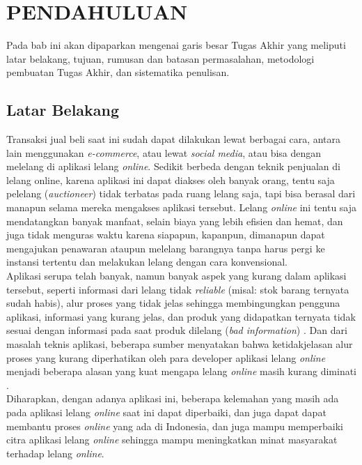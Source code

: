 \chapter{PENDAHULUAN}
  Pada bab ini akan dipaparkan mengenai garis besar Tugas Akhir yang meliputi latar belakang, tujuan, rumusan dan batasan permasalahan, metodologi pembuatan Tugas Akhir, dan sistematika penulisan.
  
  \section{Latar Belakang}	
	\indent Transaksi jual beli saat ini sudah dapat dilakukan lewat berbagai cara, antara lain menggunakan \textit{e-commerce}, atau lewat \textit{social media}, atau bisa dengan melelang di aplikasi lelang \textit{online}. Sedikit berbeda dengan teknik penjualan di lelang online, karena aplikasi ini dapat diakses oleh banyak orang, tentu saja pelelang (\textit{auctioneer}) tidak terbatas pada ruang lelang saja, tapi bisa berasal dari manapun selama mereka mengakses aplikasi tersebut.  Lelang \textit{online} ini tentu saja mendatangkan banyak manfaat, selain biaya yang lebih efisien dan hemat, dan juga tidak menguras waktu karena siapapun, kapanpun, dimanapun dapat mengajukan penawaran ataupun melelang barangnya tanpa harus pergi ke instansi tertentu dan melakukan lelang dengan cara konvensional.
    \\
    \indent Aplikasi serupa telah banyak, namun banyak aspek yang kurang dalam aplikasi tersebut, seperti informasi dari lelang tidak \textit{reliable} (misal: stok barang ternyata sudah habis), alur proses yang tidak jelas sehingga membingungkan pengguna aplikasi, informasi yang kurang jelas, dan produk yang didapatkan ternyata tidak sesuai dengan informasi pada saat produk dilelang (\textit{bad information}) \cite{ying-feng_kuo_online_2016}. Dan dari masalah teknis aplikasi, beberapa sumber menyatakan bahwa ketidakjelasan alur proses yang kurang diperhatikan oleh para developer aplikasi lelang \textit{online} menjadi beberapa alasan yang kuat mengapa lelang \textit{online} masih kurang diminati \cite{noauthor_sistem_nodate}.
    \\
	\indent Diharapkan, dengan adanya aplikasi ini, beberapa kelemahan yang masih ada pada aplikasi lelang \textit{online} saat ini dapat diperbaiki, dan juga dapat dapat membantu proses \textit{online} yang ada di Indonesia, dan juga mampu memperbaiki citra aplikasi lelang \textit{online} sehingga mampu meningkatkan minat masyarakat terhadap lelang \textit{online}.
    
